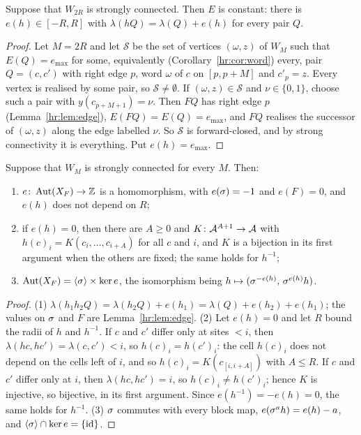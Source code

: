 \begin{proposition}\label{hr:prop:offset}
Suppose that $W_{2R}$ is strongly connected. Then $E$ is constant: there is $e(h)\in[-R,R]$ with $\lambda(hQ)=\lambda(Q)+e(h)$ for every pair $Q$.
\end{proposition}

\begin{proof}
Let $M=2R$ and let $\mathcal S$ be the set of vertices $(\omega,z)$ of $W_M$ such that $E(Q)=e_{\max}$ for some, equivalently (Corollary~\ref{hr:cor:word}) every, pair $Q=(c,c')$ with right edge $p$, word $\omega$ of $c$ on $[p,p+M]$ and $c'_p=z$. Every vertex is realised by some pair, so $\mathcal S\ne\emptyset$. If $(\omega,z)\in\mathcal S$ and $\nu\in\{0,1\}$, choose such a pair with $y(c_{p+M+1})=\nu$. Then $FQ$ has right edge $p$ (Lemma~\ref{hr:lem:edge}), $E(FQ)=E(Q)=e_{\max}$, and $FQ$ realises the successor of $(\omega,z)$ along the edge labelled $\nu$. So $\mathcal S$ is forward-closed, and by strong connectivity it is everything. Put $e(h)=e_{\max}$.
\end{proof}

\begin{corollary}\label{hr:cor:reduce}
Suppose that $W_M$ is strongly connected for every $M$. Then:
\begin{enumerate}
\item $e\colon\operatorname{Aut}(X_F)\to\mathbb{Z}$ is a homomorphism, with $e(\sigma)=-1$ and $e(F)=0$, and $e(h)$ does not depend on $R$;
\item if $e(h)=0$, then there are $A\ge0$ and $K\colon\mathcal{A}^{A+1}\to\mathcal{A}$ with $h(c)_i=K(c_i,\dots,c_{i+A})$ for all $c$ and $i$, and $K$ is a bijection in its first argument when the others are fixed; the same holds for $h^{-1}$;
\item $\operatorname{Aut}(X_F)=\langle\sigma\rangle\times\ker e$, the isomorphism being $h\mapsto(\sigma^{-e(h)},\,\sigma^{e(h)}h)$.
\end{enumerate}
\end{corollary}

\begin{proof}
(1) $\lambda(h_1h_2Q)=\lambda(h_2Q)+e(h_1)=\lambda(Q)+e(h_2)+e(h_1)$; the values on $\sigma$ and $F$ are Lemma~\ref{hr:lem:edge}. (2) Let $e(h)=0$ and let $R$ bound the radii of $h$ and $h^{-1}$. If $c$ and $c'$ differ only at sites $<i$, then $\lambda(hc,hc')=\lambda(c,c')<i$, so $h(c)_i=h(c')_i$: the cell $h(c)_i$ does not depend on the cells left of $i$, and so $h(c)_i=K(c_{[i,i+A]})$ with $A\le R$. If $c$ and $c'$ differ only at $i$, then $\lambda(hc,hc')=i$, so $h(c)_i\ne h(c')_i$; hence $K$ is injective, so bijective, in its first argument. Since $e(h^{-1})=-e(h)=0$, the same holds for $h^{-1}$. (3) $\sigma$ commutes with every block map, $e(\sigma^ah)=e(h)-a$, and $\langle\sigma\rangle\cap\ker e=\{\mathrm{id}\}$.
\end{proof}

